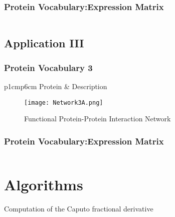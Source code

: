 \subsubsection{Protein Vocabulary:Expression Matrix}

\begin{equation}
\end{equation}

\subsection{Application III}

\subsubsection{Protein Vocabulary 3}

\begin{table}[H]\tiny
\caption{Gene and Protein Annotations}	
	\begin{tabular}{p{1cm}p{6cm}}
		\hline
		Protein & Description \\   
		\hline
	\hline
\end{tabular}
\end{table}

\begin{figure}[H]
	\centering
	\begin{minipage}[b]{1\linewidth}
		\texttt{[image: Network3A.png]}
	\end{minipage}\hfill
	\caption{Functional Protein-Protein Interaction Network}
	\label{fig:Figure1}
\end{figure} 


\subsubsection{Protein Vocabulary:Expression Matrix}

\begin{equation}
\end{equation}

\section{Algorithms}

\begin{algorithm}[H]
\footnotesize
\begin{algorithmic}[1]

\end{algorithmic}
\caption{Computation of the Caputo fractional derivative}
	\label{Algorithm_1}
\end{algorithm}

